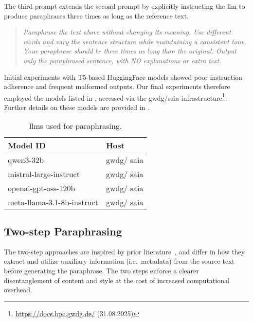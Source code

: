 The third prompt extends the second prompt by explicitly instructing the \ac{llm} to produce paraphrases three times as long as the reference text.
\begin{quote}
  \textit{Paraphrase the text above without changing its meaning. Use different words and vary the sentence structure while maintaining a consistent tone. Your paraphrase should be three times as long than the original. Output only the paraphrased sentence, with NO explanations or extra text.}
\end{quote}

Initial experiments with T5-based HuggingFace models showed poor instruction adherence and frequent malformed outputs. 
Our final experiments therefore employed the models listed in , accessed via the \ac{gwdg}/\ac{saia} infrastructure\footnote{\url{https://docs.hpc.gwdg.de/} (31.08.2025)}.
Further details on these models are provided in .

\begin{table}[h]
\centering
\caption{\acp{llm} used for paraphrasing.}
\label{tab:base_llms}
\begin{tabular}{@{}ll@{}}
\toprule
\textbf{Model ID}                    & \textbf{Host} \\
\midrule
qwen3-32b                            & \ac{gwdg}/ \ac{saia}    \\
mistral-large-instruct               & \ac{gwdg}/ \ac{saia}    \\
openai-gpt-oss-120b                  & \ac{gwdg}/ \ac{saia}    \\
meta-llama-3.1-8b-instruct           & \ac{gwdg}/ \ac{saia}    \\
\bottomrule   
\end{tabular}%
\end{table}


\subsection{Two-step Paraphrasing}

The two-step approaches are inspired by prior literature~\citep{bevendorff_overview_2024, ayele_overview_2024}, and differ in how they extract and utilize auxiliary information (i.e.\ metadata) from the source text before generating the paraphrase. 
The two steps enforce a clearer disentanglement of content and style at the cost of increased computational overhead.

